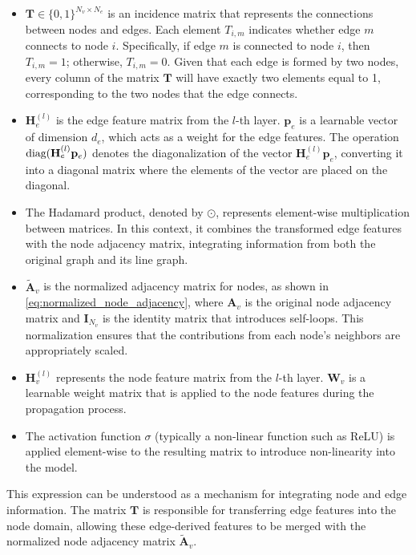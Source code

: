 \begin{itemize}
    \item \( \mathbf{T} \in \{0, 1\}^{N_v \times N_e} \) is an incidence matrix that represents the connections between nodes and edges. Each element \( T_{i,m} \) indicates whether edge \( m \) connects to node \( i \). Specifically, if edge \( m \) is connected to node \( i \), then \( T_{i,m} = 1 \); otherwise, \( T_{i,m} = 0 \). Given that each edge is formed by two nodes, every column of the matrix \( \mathbf{T} \) will have exactly two elements equal to 1, corresponding to the two nodes that the edge connects. 
    \item \( \mathbf{H}^{(l)}_e \) is the edge feature matrix from the \( l \)-th layer. \( \mathbf{p}_e \) is a learnable vector of dimension \( d_e \), which acts as a weight for the edge features. The operation \(  \textup{diag}(\mathbf{H}^{(l)}_e \mathbf{p}_e) \) denotes the diagonalization of the vector \( \mathbf{H}^{(l)}_e \mathbf{p}_e \), converting it into a diagonal matrix where the elements of the vector are placed on the diagonal. 
    \item The Hadamard product, denoted by \( \odot \), represents element-wise multiplication between matrices. In this context, it combines the transformed edge features with the node adjacency matrix, integrating information from both the original graph and its line graph.
    \item \( \tilde{\mathbf{A}}_v\) is the normalized adjacency matrix for nodes, as shown in \cref{eq:normalized_node_adjacency}, where \( \mathbf{A}_v \) is the original node adjacency matrix and \( \mathbf{I}_{N_v} \) is the identity matrix that introduces self-loops. This normalization ensures that the contributions from each node's neighbors are appropriately scaled. 
    \item \( \mathbf{H}^{(l)}_v \) represents the node feature matrix from the \( l \)-th layer. \( \mathbf{W}_v \) is a learnable weight matrix that is applied to the node features during the propagation process. 
    \item The activation function \( \sigma \) (typically a non-linear function such as ReLU) is applied element-wise to the resulting matrix to introduce non-linearity into the model.
\end{itemize}


This expression can be understood as a mechanism for integrating node and edge information. The matrix \( \mathbf{T} \) is responsible for transferring edge features into the node domain, allowing these edge-derived features to be merged with the normalized node adjacency matrix \( \tilde{\mathbf{A}}_v \). 



